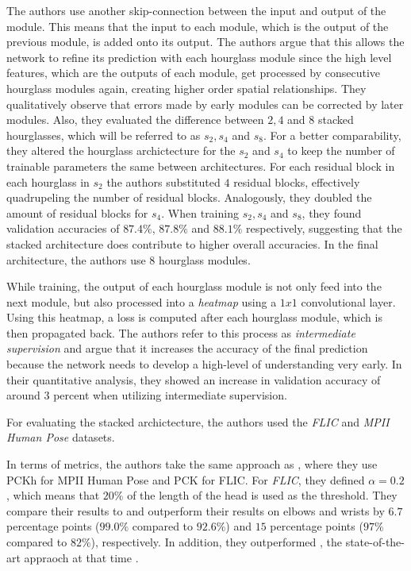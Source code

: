 The authors use another skip-connection between the input and output of the module.
This means that the input to each module, which is the output of the previous module, is added onto its output.
The authors argue that this allows the network to refine its prediction with each hourglass module since the high level features, which are the outputs of each module, get processed by consecutive hourglass modules again, creating higher order spatial relationships.
They qualitatively observe that errors made by early modules can be corrected by later modules.
Also, they evaluated the difference between $2, 4$ and $8$ stacked hourglasses, which will be referred to as $s_2, s_4$ and $s_8$.
For a better comparability, they altered the hourglass archictecture for the $s_2$ and $s_4$ to keep the number of trainable parameters the same between architectures.
For each residual block in each hourglass in $s_2$ the authors substituted $4$ residual blocks, effectively quadrupeling the number of residual blocks.
Analogously, they doubled the amount of residual blocks for $s_4$.
When training $s_2, s_4$ and $s_8$, they found validation accuracies of $87.4\%$, $87.8\%$ and $88.1\%$ respectively, suggesting that the stacked architecture does contribute to higher overall accuracies.
In the final architecture, the authors use $8$ hourglass modules.

While training, the output of each hourglass module is not only feed into the next module, but also processed into a \textit{heatmap} using a $1x1$ convolutional layer.
Using this heatmap, a loss is computed after each hourglass module, which is then propagated back.
The authors refer to this process as \textit{intermediate supervision} and argue that it increases the accuracy of the final prediction because the network needs to develop a high-level of understanding very early.
In their quantitative analysis, they showed an increase in validation accuracy of around $3$ percent when utilizing intermediate supervision. 

For evaluating the stacked archictecture, the authors used the \textit{FLIC}  and \textit{MPII Human Pose} \cite{andriluka_2d_2014} datasets.

In terms of metrics, the authors take the same approach as \cite{wei_convolutional_2016}, where they use PCKh for MPII Human Pose and PCK for FLIC.
For \textit{FLIC}, they defined $\alpha = 0.2$, which means that $20\%$ of the length of the head is used as the threshold.
They compare their results to \cite{toshev_deeppose:_2014} and outperform their results on elbows and wrists by $6.7$ percentage points ($99.0\%$ compared to $92.6\%$) and $15$ percentage points ($97\%$ compared to $82\%$), respectively.
In addition, they outperformed \cite{wei_convolutional_2016}, the state-of-the-art appraoch at that time .


